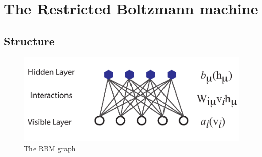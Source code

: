 \documentclass[norsk,a4paper,11pt]{article}
\begin{document}
\section{The Restricted Boltzmann machine}
\subsection{Structure}

\begin{figure}
    \includegraphics[width=0.9\linewidth]{RBM.pdf}
    \caption{
        \label{fig:RBMgraph}
        The RBM graph}
\end{figure}
\end{document}
